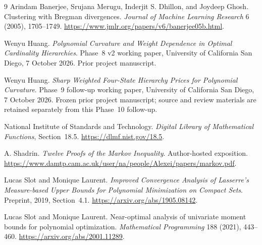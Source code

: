 \begin{thebibliography}{9}
Arindam Banerjee, Srujana Merugu, Inderjit S. Dhillon, and Joydeep Ghosh.
Clustering with Bregman divergences.
\emph{Journal of Machine Learning Research} 6 (2005), 1705--1749.
\url{https://www.jmlr.org/papers/v6/banerjee05b.html}.

Wenyu Huang.
\emph{Polynomial Curvature and Weight Dependence in Optimal Cardinality
Hierarchies}. Phase~8 v2 working paper, University of California San Diego,
7 October 2026. Prior project manuscript.

Wenyu Huang.
\emph{Sharp Weighted Four-State Hierarchy Prices for Polynomial Curvature}.
Phase~9 follow-up working paper, University of California San Diego,
7 October 2026. Frozen prior project manuscript; source and review
materials are retained separately from this Phase~10 follow-up.

National Institute of Standards and Technology.
\emph{Digital Library of Mathematical Functions}, Section~18.5.
\url{https://dlmf.nist.gov/18.5}.

A. Shadrin.
\emph{Twelve Proofs of the Markov Inequality}. Author-hosted exposition.
\url{https://www.damtp.cam.ac.uk/user/na/people/Alexei/papers/markov.pdf}.

Lucas Slot and Monique Laurent.
\emph{Improved Convergence Analysis of Lasserre's Measure-based Upper Bounds
for Polynomial Minimization on Compact Sets}. Preprint, 2019,
Section~4.1. \url{https://arxiv.org/abs/1905.08142}.

Lucas Slot and Monique Laurent.
Near-optimal analysis of univariate moment bounds for polynomial optimization.
\emph{Mathematical Programming} 188 (2021), 443--460.
\url{https://arxiv.org/abs/2001.11289}.
\end{thebibliography}
